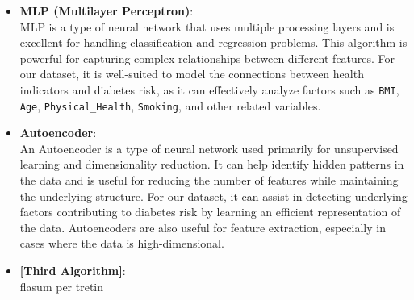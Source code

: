 \begin{itemize}
    \item \textbf{MLP (Multilayer Perceptron)}: \\
    MLP is a type of neural network that uses multiple processing layers and is excellent for handling classification and regression problems. This algorithm is powerful for capturing complex relationships between different features. For our dataset, it is well-suited to model the connections between health indicators and diabetes risk, as it can effectively analyze factors such as \texttt{BMI}, \texttt{Age}, \texttt{Physical\_Health}, \texttt{Smoking}, and other related variables.

    \item \textbf{Autoencoder}: \\
    An Autoencoder is a type of neural network used primarily for unsupervised learning and dimensionality reduction. It can help identify hidden patterns in the data and is useful for reducing the number of features while maintaining the underlying structure. For our dataset, it can assist in detecting underlying factors contributing to diabetes risk by learning an efficient representation of the data. Autoencoders are also useful for feature extraction, especially in cases where the data is high-dimensional.
    
    \item \textbf{[Third Algorithm]}: \\
    flasum per tretin
\end{itemize}
